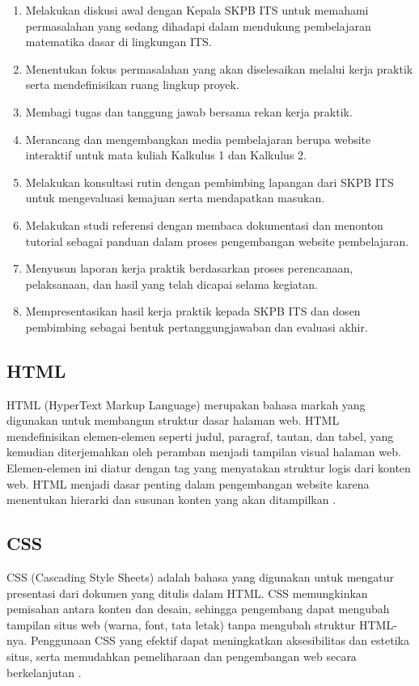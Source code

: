 \documentclass{file/KP-ITS}
\theoremstyle{definition}
\theoremstyle{definition}
\theoremstyle{plain}
\begin{document}
\begin{enumerate}
    \item Melakukan diskusi awal dengan Kepala SKPB ITS untuk memahami permasalahan yang sedang dihadapi dalam mendukung pembelajaran matematika dasar di lingkungan ITS.
    \item Menentukan fokus permasalahan yang akan diselesaikan melalui kerja praktik serta mendefinisikan ruang lingkup proyek.
    \item Membagi tugas dan tanggung jawab bersama rekan kerja praktik.
    \item Merancang dan mengembangkan media pembelajaran berupa website interaktif untuk mata kuliah Kalkulus 1 dan Kalkulus 2.
    \item Melakukan konsultasi rutin dengan pembimbing lapangan dari SKPB ITS untuk mengevaluasi kemajuan serta mendapatkan masukan.
    \item Melakukan studi referensi dengan membaca dokumentasi dan menonton tutorial sebagai panduan dalam proses pengembangan website pembelajaran.
    \item Menyusun laporan kerja praktik berdasarkan proses perencanaan, pelaksanaan, dan hasil yang telah dicapai selama kegiatan.
    \item Mempresentasikan hasil kerja praktik kepada SKPB ITS dan dosen pembimbing sebagai bentuk pertanggungjawaban dan evaluasi akhir.
\end{enumerate}

\subsection{HTML}

HTML (HyperText Markup Language) merupakan bahasa markah yang digunakan untuk membangun struktur dasar halaman web. HTML mendefinisikan elemen-elemen seperti judul, paragraf, tautan, dan tabel, yang kemudian diterjemahkan oleh peramban menjadi tampilan visual halaman web. Elemen-elemen ini diatur dengan tag yang menyatakan struktur logis dari konten web. HTML menjadi dasar penting dalam pengembangan website karena menentukan hierarki dan susunan konten yang akan ditampilkan \cite{sharma2024}.

\subsection{CSS}

CSS (Cascading Style Sheets) adalah bahasa yang digunakan untuk mengatur presentasi dari dokumen yang ditulis dalam HTML. CSS memungkinkan pemisahan antara konten dan desain, sehingga pengembang dapat mengubah tampilan situs web (warna, font, tata letak) tanpa mengubah struktur HTML-nya. Penggunaan CSS yang efektif dapat meningkatkan aksesibilitas dan estetika situs, serta memudahkan pemeliharaan dan pengembangan web secara berkelanjutan \cite{hasan2022}.
\end{document}
